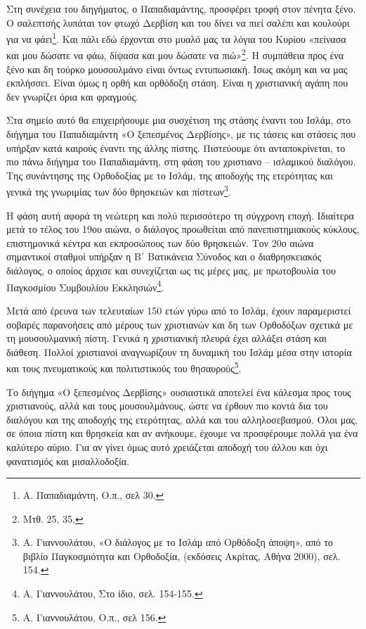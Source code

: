 \documentclass{article}
\begin{document}
Στη συνέχεια του διηγήματος, ο Παπαδιαμάντης, προσφέρει τροφή στον πένητα ξένο. Ο σαλεπτσής λυπάται τον φτωχό Δερβίση και του δίνει να πιεί σαλέπι και κουλούρι για να φάει\footnote{Α. Παπαδιαμάντη, Ο.π., σελ 30.}. Και πάλι εδώ έρχονται στο μυαλό μας τα λόγια του Κυρίου «πείνασα και μου δώσατε να φάω, δίψασα και μου δώσατε να πιώ»\footnote{Μτθ. 25, 35.}. Η συμπάθεια προς ένα ξένο και δη τούρκο μουσουλμάνο είναι όντως εντυπωσιακή. Ίσως ακόμη και να μας εκπλήσσει. Είναι όμως η ορθή και ορθόδοξη στάση. Είναι η χριστιανική αγάπη που δεν γνωρίζει όρια και φραγμούς.

Στα σημείο αυτό θα επιχειρήσουμε μια συσχέτιση της στάσης έναντι του Ισλάμ, στο διήγημα του Παπαδιαμάντη «Ο ξεπεσμένος Δερβίσης», με τις τάσεις και στάσεις που υπήρξαν κατά καιρούς έναντι της άλλης πίστης.  Πιστεύουμε ότι ανταποκρίνεται, το πιο πάνω διήγημα του Παπαδιαμάντη, στη φάση του χριστιανο – ισλαμικού διαλόγου. Της συνάντησης της Ορθοδοξίας με το Ισλάμ, της αποδοχής της ετερότητας και γενικά της γνωριμίας των δύο θρησκειών και πίστεων\footnote{Α. Γιαννουλάτου, «Ο διάλογος με το Ισλάμ από Ορθόδοξη άποψη», από το βιβλίο Παγκοσμιότητα και Ορθοδοξία, (εκδόσεις Ακρίτας, Αθήνα 2000), σελ. 154.}.

Η φάση αυτή αφορά τη νεώτερη και πολύ περισσότερο τη σύγχρονη εποχή. Ιδιαίτερα μετά το τέλος του 19ου αιώνα, ο διάλογος προωθείται από πανεπιστημιακούς κύκλους, επιστημονικά κέντρα και εκπροσώπους των δύο θρησκειών. Τον 20ο αιώνα σημαντικοί σταθμοί υπήρξαν η Β΄ Βατικάνεια Σύνοδος και ο διαθρησκειακός διάλογος, ο οποίος άρχισε και συνεχίζεται ως τις μέρες μας, με πρωτοβουλία του Παγκοσμίου Συμβουλίου Εκκλησιών\footnote{Α. Γιαννουλάτου, Στο ίδιο, σελ. 154-155.}.

Μετά από έρευνα των τελευταίων 150 ετών γύρω από το Ισλάμ, έχουν παραμεριστεί σοβαρές παρανοήσεις από μέρους των χριστιανών και δη των Ορθοδόξων σχετικά με τη μουσουλμανική πίστη. Γενικά η χριστιανική πλευρά έχει αλλάξει στάση και διάθεση. Πολλοί χριστιανοί αναγνωρίζουν τη δυναμική του Ισλάμ μέσα στην ιστορία και τους πνευματικούς και πολιτιστικούς του θησαυρούς\footnote{Α. Γιαννουλάτου, Ο.π., σελ 156.}.

Το διήγημα «Ο ξεπεσμένος Δερβίσης» ουσιαστικά αποτελεί ένα κάλεσμα προς τους χριστιανούς, αλλά και τους μουσουλμάνους, ώστε να έρθουν πιο κοντά δια του διαλόγου και της αποδοχής της ετερότητας, αλλά και του αλληλοσεβασμού. Όλοι μας, σε όποια πίστη και θρησκεία και αν ανήκουμε, έχουμε να προσφέρουμε πολλά για ένα καλύτερο αύριο. Για αν γίνει όμως αυτό χρειάζεται αποδοχή του άλλου και όχι φανατισμός και μισαλλοδοξία.
\end{document}
